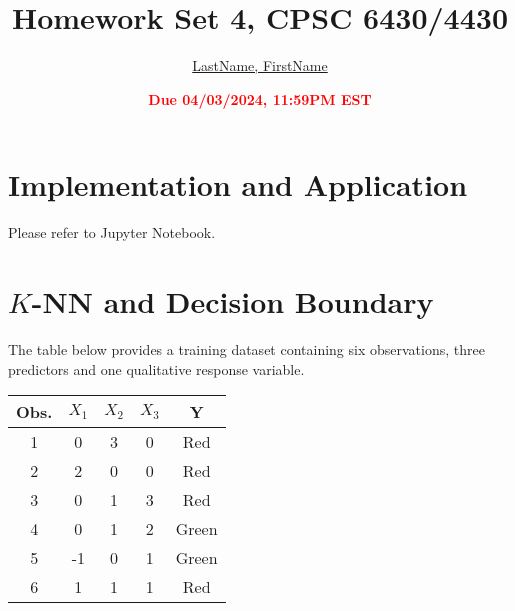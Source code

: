 \documentclass[11pt]{article}
\title{{\bf Homework Set 4, CPSC 6430/4430}}
\author{\Large\underline{LastName, FirstName}}
\date{\textbf{\Large\textcolor{red}{Due 04/03/2024, 11:59PM EST}}}
\newcommand{\R}{\mathbb{R}}
\newcommand{\minimize}{\operatorname*{minimize\ }}
\newcommand{\mtx}[1]{\mathbf{#1}}
\newcommand{\vct}[1]{\mathbf{#1}}
\def \mA {\mtx{A}}
\def \mI {\mtx{I}}
\def \mU {\mtx{U}}
\def \mX {\mtx{X}}
\def \mZ {\mtx{Z}}
\def \vv {\vct{v}}
\def \vx {\vct{x}}
\def \vy {\vct{y}}
\def \R {\mathbb{R}}
\begin{document}
\maketitle

\section*{Implementation and Application}
Please refer to Jupyter Notebook.
\newpage
\section*{$K$-NN and Decision Boundary }
The table below provides a training dataset containing six observations, three predictors and one qualitative response variable.

\vspace{.4cm}
{
\centering
\begin{tabular}{|c|c|c|c|c|}
	\hline
	Obs.& $X_1$ & $X_2$ & $X_3$ & Y \\
	\hline
	1&  0& 3 & 0 & Red \\
	\hline
	2& 2 & 0 &  0& Red \\
	\hline
	3&0  &1  & 3 & Red \\
	\hline
	4&  0& 1 & 2 & Green \\
	\hline
	5& -1 &0  &1  &Green  \\
	\hline
	6&  1& 1 &1  &  Red\\
	\hline
\end{tabular}\par
}
\vspace{.3cm}
\end{document}
